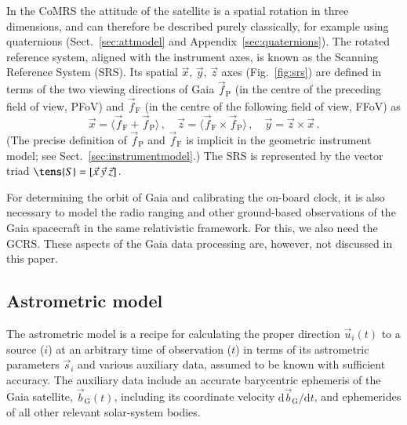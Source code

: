 \documentclass[structabstract]{aa}
\begin{document}
In the CoMRS the attitude of the satellite is a spatial rotation in three
dimensions, and can therefore be described purely classically, for example
using quaternions (Sect.~\ref{sec:attmodel} and Appendix~\ref{sec:quaternions}). 
The rotated reference system,
aligned with the instrument axes, is known as the Scanning Reference System
(SRS). Its spatial $\vec{x}$, $\vec{y}$, $\vec{z}$ axes (Fig.~\ref{fig:srs})
are defined in terms of the two viewing directions of Gaia $\vec{f}_\text{P}$ (in the
centre of the preceding field of view, PFoV) and $\vec{f}_\text{F}$ (in the
centre of the following field of view, FFoV) as
\begin{equation}\label{eq:xyz}
\vec{x}=\langle\vec{f}_\text{F}+\vec{f}_\text{P}\rangle\, , \quad
\vec{z}=\langle\vec{f}_\text{F}\times\vec{f}_\text{P}\rangle\, , \quad
\vec{y}=\vec{z}\times\vec{x} \, .
\end{equation}
(The precise definition of $\vec{f}_\text{P}$ and $\vec{f}_\text{F}$ is
implicit in the geometric instrument model; see 
Sect.~\ref{sec:instrumentmodel}.) The SRS is represented by the vector
triad $\tens{S}=[\vec{x}~\vec{y}~\vec{z}]$.

For determining the orbit of Gaia and calibrating the on-board clock, it
is also necessary to model the radio ranging and other ground-based observations
of the Gaia spacecraft in the same relativistic framework. For this, we also need the GCRS. These
aspects of the Gaia data processing are, however, not discussed in this paper.


\subsection{Astrometric model }\label{sec:astromodel}

The astrometric model is a recipe for calculating the proper direction
$\vec{u}_i(t)$ to a source ($i$) at an arbitrary time of observation ($t$) in
terms of its astrometric parameters $\vec{s}_i$ and various auxiliary data,
assumed to be known with sufficient accuracy. The auxiliary data include an
accurate barycentric ephemeris of the Gaia satellite, $\vec{b}_\text{G}(t)$,
including its coordinate velocity $\text{d}\vec{b}_\text{G}/\text{d}t$,
and ephemerides of all other relevant solar-system bodies.
\end{document}
